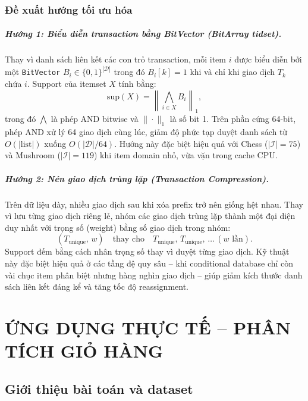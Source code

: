 \documentclass[12pt,a4paper]{report}
\begin{document}
\subsection{Đề xuất hướng tối ưu hóa}

\paragraph{Hướng 1: Biểu diễn transaction bằng BitVector (BitArray tidset).}
Thay vì danh sách liên kết các con trỏ transaction, mỗi item $i$ được biểu diễn bởi
một \texttt{BitVector} $B_i \in \{0,1\}^{|\mathcal{D}|}$ trong đó $B_i[k] = 1$
khi và chỉ khi giao dịch $T_k$ chứa $i$. Support của itemset $X$ tính bằng:
\[
    \mathrm{sup}(X) = \left\|\bigwedge_{i \in X} B_i\right\|_1,
\]
trong đó $\bigwedge$ là phép AND bitwise và $\|\cdot\|_1$ là số bit 1.
Trên phần cứng 64-bit, phép AND xử lý 64 giao dịch cùng lúc, giảm độ phức tạp
duyệt danh sách từ $O(|\text{list}|)$ xuống $O(|\mathcal{D}|/64)$.
Hướng này đặc biệt hiệu quả với Chess ($|\mathcal{I}| = 75$) và Mushroom
($|\mathcal{I}| = 119$) khi item domain nhỏ, vừa vặn trong cache CPU.

\paragraph{Hướng 2: Nén giao dịch trùng lặp (Transaction Compression).}
Trên dữ liệu dày, nhiều giao dịch sau khi xóa prefix trở nên giống hệt nhau.
Thay vì lưu từng giao dịch riêng lẻ, nhóm các giao dịch trùng lặp thành một đại
diện duy nhất với trọng số (weight) bằng số giao dịch trong nhóm:
\[
    (T_{\text{unique}},\, w) \quad \text{thay cho} \quad T_{\text{unique}},\,
    T_{\text{unique}},\, \dots\, (w \text{ lần}).
\]
Support đếm bằng cách nhân trọng số thay vì duyệt từng giao dịch. Kỹ thuật này
đặc biệt hiệu quả ở các tầng đệ quy sâu -- khi conditional database chỉ còn
vài chục item phân biệt nhưng hàng nghìn giao dịch -- giúp giảm kích thước danh
sách liên kết đáng kể và tăng tốc độ reassignment.
 
 
\chapter{ỨNG DỤNG THỰC TẾ -- PHÂN TÍCH GIỎ HÀNG}

\section{Giới thiệu bài toán và dataset}
\end{document}
